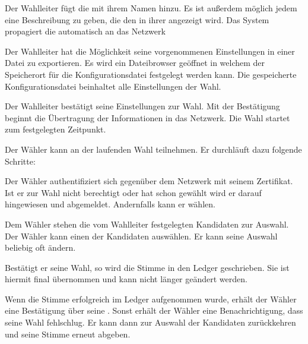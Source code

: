 \documentclass[parskip=full,11pt,twoside]{scrartcl}
\begin{document}
Der \gls{Wahlleiter} fügt die  mit ihrem Namen hinzu. Es ist außerdem möglich jedem  eine Beschreibung zu geben, die den  in ihrer  angezeigt wird. Das System propagiert die  automatisch an das Netzwerk

Der \gls{Wahlleiter} hat die Möglichkeit seine vorgenommenen Einstellungen in einer Datei zu exportieren.
Es wird ein Dateibrowser geöffnet in welchem der Speicherort für die Konfigurationsdatei festgelegt werden kann.
Die gespeicherte Konfigurationsdatei beinhaltet alle Einstellungen der Wahl.

Der \gls{Wahlleiter} bestätigt seine Einstellungen zur Wahl. Mit der Bestätigung beginnt die Übertragung der Informationen in das Netzwerk. Die \gls{Wahl} startet zum festgelegten Zeitpunkt.

Der Wähler kann an der laufenden Wahl teilnehmen. Er durchläuft dazu folgende Schritte:

Der Wähler authentifiziert sich gegenüber dem Netzwerk mit seinem Zertifikat.
Ist er zur Wahl nicht berechtigt oder hat schon gewählt wird er darauf hingewiesen und abgemeldet.
Andernfalls kann er wählen.

Dem Wähler stehen die vom \gls{Wahlleiter} festgelegten Kandidaten zur Auswahl.
Der Wähler kann einen der Kandidaten auswählen.
Er kann seine Auswahl beliebig oft ändern.

Bestätigt er seine Wahl, so wird die Stimme in den \gls{Ledger} geschrieben.
Sie ist hiermit final übernommen und kann nicht länger geändert werden.

Wenn die Stimme erfolgreich im \gls{Ledger} aufgenommen wurde, erhält der Wähler eine Bestätigung über seine .
Sonst erhält der Wähler eine Benachrichtigung, dass seine Wahl fehlschlug.
Er kann dann zur Auswahl der Kandidaten zurückkehren und seine Stimme erneut abgeben.
\end{document}

